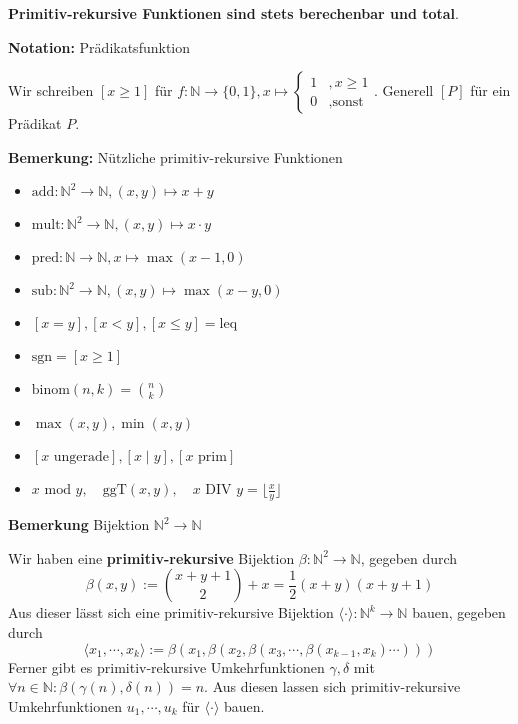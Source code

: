 \documentclass[a4paper,graphics,11pt]{article}
\begin{document}
\textbf{Primitiv-rekursive Funktionen sind stets berechenbar und total}.

\strut

\textbf{Notation:} Prädikatsfunktion

Wir schreiben $[x \geq 1]$ für $f : \mathbb{N} \to \{0,1\}, x \mapsto \begin{cases}1 &, x \geq 1\\ 0 &, \text{sonst}\end{cases}$. Generell $[P]$ für ein Prädikat $P$.

\newpage

\textbf{Bemerkung:} Nützliche primitiv-rekursive Funktionen

\begin{minipage}{.5\textwidth}
\begin{itemize}
    \item $\text{add}:\mathbb{N}^2 \to \mathbb{N}, (x,y) \mapsto x+y$
    \item $\text{mult}: \mathbb{N}^2 \to \mathbb{N}, (x,y) \mapsto x \cdot y$
    \item $\text{pred}: \mathbb{N} \to \mathbb{N}, x \mapsto \max(x-1, 0)$
    \item $\text{sub}: \mathbb{N}^2 \to \mathbb{N}, (x,y) \mapsto \max(x-y, 0)$
    \item $[x = y], [x < y], [x \leq y] = \text{leq}$
\end{itemize}
\end{minipage}
\begin{minipage}{.5\textwidth}
\begin{itemize}
    \item $\text{sgn} = [x \geq 1]$
    \item $\text{binom}(n,k) = \binom{n}{k}$
    \item $\max(x,y), \min(x,y)$
    \item $[x \text{ ungerade}], [x \mid y], [x \text{ prim}]$
    \item $x\text{ mod } y,\quad \text{ggT}(x,y),\quad x\text{ DIV }y = \lfloor\frac{x}{y}\rfloor$
\end{itemize}
\end{minipage}

\strut

\textbf{Bemerkung} Bijektion $\mathbb{N}^2 \to \mathbb{N}$

Wir haben eine \textbf{primitiv-rekursive} Bijektion $\beta : \mathbb{N}^2 \to \mathbb{N}$, gegeben durch
$$
    \beta(x,y) := \binom{x+y+1}{2}+x = \frac{1}{2}(x+y)(x+y+1)
$$
Aus dieser lässt sich eine primitiv-rekursive Bijektion $\langle\cdot\rangle : \mathbb{N}^{k} \to \mathbb{N}$ bauen, gegeben durch
$$
    \langle x_1,\cdots,x_k\rangle := \beta(x_1,\beta(x_2,\beta(x_3,\cdots,\beta(x_{k-1},x_k)\cdots)))
$$
Ferner gibt es primitiv-rekursive Umkehrfunktionen
$\gamma,\delta$ mit $\forall n \in \mathbb{N}: \beta(\gamma(n),\delta(n)) = n$.
Aus diesen lassen sich primitiv-rekursive Umkehrfunktionen $u_1,\cdots,u_k$ für $\langle\cdot\rangle$ bauen.
\end{document}
